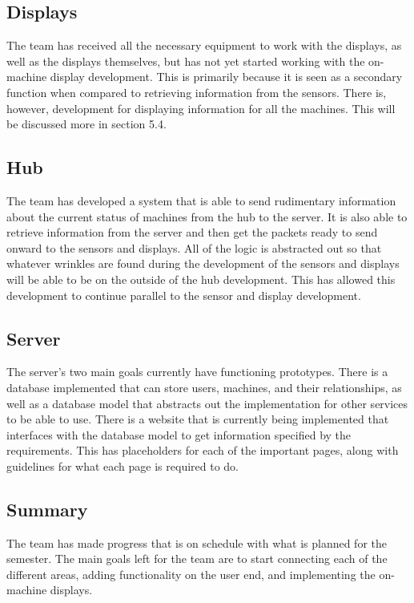 \documentclass[letterpaper,11pt]{./templates/texMemo} %
\begin{document}
\subsection{Displays}
The team has received all the necessary equipment to work with the displays, as well as the displays themselves, but has not yet started working with the on-machine display development. This is primarily because it is seen as a secondary function when compared to retrieving information from the sensors. There is, however, development for displaying information for all the machines. This will be discussed more in section 5.4.

\subsection{Hub}
The team has developed a system that is able to send rudimentary information about the current status of machines from the hub to the server. It is also able to retrieve information from the server and then get the packets ready to send onward to the sensors and displays. All of the logic is abstracted out so that whatever wrinkles are found during the development of the sensors and displays will be able to be on the outside of the hub development. This has allowed this development to continue parallel to the sensor and display development.

\subsection{Server}
The server's two main goals currently have functioning prototypes. There is a database implemented that can store users, machines, and their relationships, as well as a database model that abstracts out the implementation for other services to be able to use. There is a website that is currently being implemented that interfaces with the database model to get information specified by the requirements. This has placeholders for each of the important pages, along with guidelines for what each page is required to do.

\subsection{Summary}
The team has made progress that is on schedule with what is planned for the semester. The main goals left for the team are to start connecting each of the different areas, adding functionality on the user end, and implementing the on-machine displays.
\end{document}
